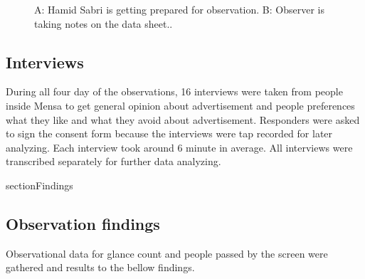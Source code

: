 \begin{figure}[!htb]
    \centering
    \hfill
    \caption{A: Hamid Sabri is getting prepared for observation. B: Observer is taking notes on the data sheet.. }%
    \label{fig:observation_env}%
\end{figure}




\subsection{Interviews}

During all four day of the observations, 16 interviews were taken from people inside Mensa to get general opinion about advertisement and people preferences what they like and what they avoid about advertisement. Responders were asked to sign the consent form because the interviews were tap recorded for later analyzing.  Each interview took around 6 minute in average. All interviews were transcribed separately for further data analyzing.

section{Findings}


\subsection{Observation findings}

Observational data for glance count and people passed by the screen were gathered and results to the bellow findings.

